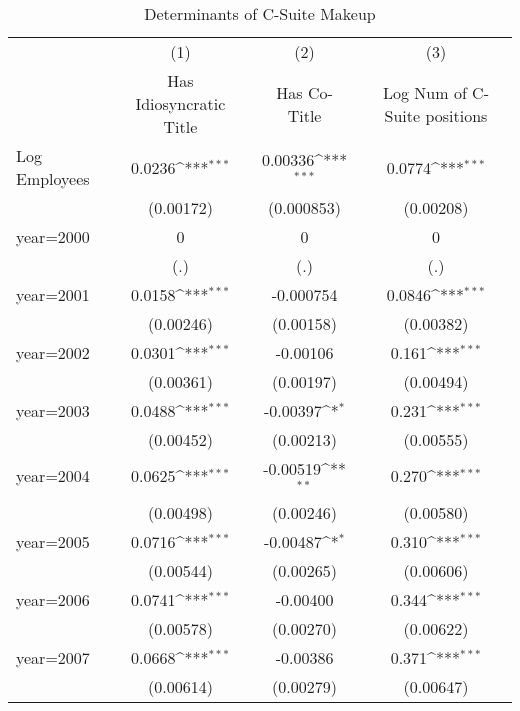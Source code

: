 {
\def\sym#1{\ifmmode^{#1}\else\(^{#1}\)\fi}
\begin{longtable}{l*{3}{c}}
\caption{Determinants of C-Suite Makeup\label{tab1}}\\
\toprule\endfirsthead\midrule\endhead\midrule\endfoot\endlastfoot
                &\multicolumn{1}{c}{(1)}&\multicolumn{1}{c}{(2)}&\multicolumn{1}{c}{(3)}\\
                &\multicolumn{1}{c}{Has Idiosyncratic Title}&\multicolumn{1}{c}{Has Co- Title}&\multicolumn{1}{c}{Log Num of C-Suite positions}\\
\midrule
Log Employees   &   0.0236\sym{***}&  0.00336\sym{***}&   0.0774\sym{***}\\
                &(0.00172)         &(0.000853)         &(0.00208)         \\
year=2000       &        0         &        0         &        0         \\
                &      (.)         &      (.)         &      (.)         \\
year=2001       &   0.0158\sym{***}&-0.000754         &   0.0846\sym{***}\\
                &(0.00246)         &(0.00158)         &(0.00382)         \\
year=2002       &   0.0301\sym{***}& -0.00106         &    0.161\sym{***}\\
                &(0.00361)         &(0.00197)         &(0.00494)         \\
year=2003       &   0.0488\sym{***}& -0.00397\sym{*}  &    0.231\sym{***}\\
                &(0.00452)         &(0.00213)         &(0.00555)         \\
year=2004       &   0.0625\sym{***}& -0.00519\sym{**} &    0.270\sym{***}\\
                &(0.00498)         &(0.00246)         &(0.00580)         \\
year=2005       &   0.0716\sym{***}& -0.00487\sym{*}  &    0.310\sym{***}\\
                &(0.00544)         &(0.00265)         &(0.00606)         \\
year=2006       &   0.0741\sym{***}& -0.00400         &    0.344\sym{***}\\
                &(0.00578)         &(0.00270)         &(0.00622)         \\
year=2007       &   0.0668\sym{***}& -0.00386         &    0.371\sym{***}\\
                &(0.00614)         &(0.00279)         &(0.00647)         \\

\end{longtable}}
